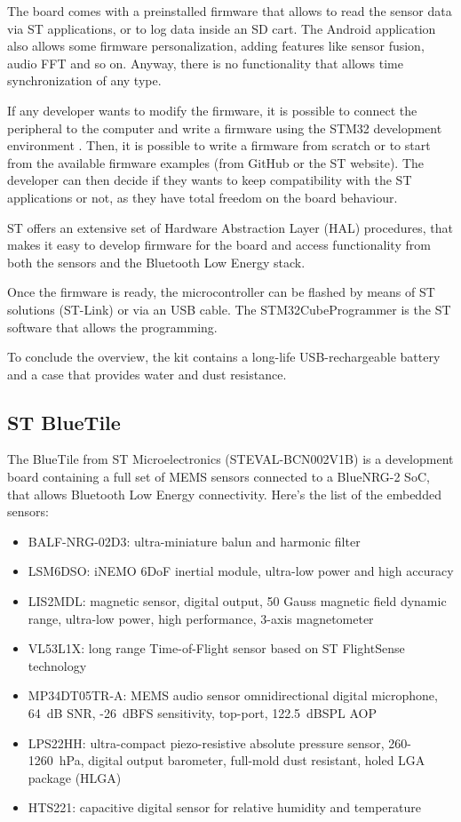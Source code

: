 The board comes with a preinstalled firmware that allows to read the sensor data via ST applications, or to log data inside an SD cart. The Android application also allows some firmware personalization, adding features like sensor fusion, audio FFT and so on. Anyway, there is no functionality that allows time synchronization of any type. 

If any developer wants to modify the firmware, it is possible to connect the peripheral to the computer and write a firmware using the STM32 development environment \cite{STM32dev}. Then, it is possible to write a firmware from scratch or to start from the available firmware examples (from GitHub or the ST website). The developer can then decide if they wants to keep compatibility with the ST applications or not, as they have total freedom on the board behaviour. 

ST offers an extensive set of Hardware Abstraction Layer (HAL) procedures, that makes it easy to develop firmware for the board and access functionality from both the sensors and the Bluetooth Low Energy stack.

Once the firmware is ready, the microcontroller can be flashed by means of ST solutions (ST-Link) or via an USB cable. The STM32CubeProgrammer \cite{STM32CubeProg} is the ST software that allows the programming. 

To conclude the overview, the kit contains a long-life USB-rechargeable battery and a case that provides water and dust resistance.  

\subsection{ST BlueTile}
The BlueTile from ST Microelectronics (STEVAL-BCN002V1B) is a development board containing a full set of MEMS sensors connected to a BlueNRG-2 SoC, that allows Bluetooth Low Energy connectivity. Here's the list of the embedded sensors:
\begin{itemize}
    \item  BALF-NRG-02D3: ultra-miniature balun and harmonic filter
    \item  LSM6DSO: iNEMO 6DoF inertial module, ultra-low power and high accuracy
    \item  LIS2MDL: magnetic sensor, digital output, 50 Gauss magnetic field dynamic range, ultra-low power, high performance, 3-axis magnetometer
    \item  VL53L1X: long range Time-of-Flight sensor based on ST FlightSense technology
    \item  MP34DT05TR-A: MEMS audio sensor omnidirectional digital microphone, 64~dB SNR, -26~dBFS sensitivity, top-port, 122.5~dBSPL AOP
    \item  LPS22HH: ultra-compact piezo-resistive absolute pressure sensor, 260-1260~hPa, digital output barometer, full-mold dust resistant, holed LGA package (HLGA)
    \item  HTS221: capacitive digital sensor for relative humidity and temperature 
\end{itemize}

